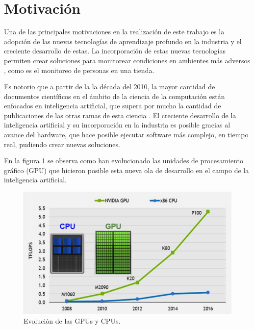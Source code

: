

\section{Motivación}
\label{sec:motivacion}

Una de las principales motivaciones en la realización de este trabajo es la adopción de las nuevas tecnologías de aprendizaje profundo en la industria y el  creciente desarrollo de estas. La incorporación de estas nuevas tecnologías permiten crear soluciones para monitorear condiciones en ambientes más adversos , como es el monitoreo de personas en una tienda.

Es notorio que a partir de la la década del 2010, la mayor cantidad de documentos científicos en el ámbito de la ciencia de la computación están enfocados en inteligencia artificial, que supera por mucho la cantidad de publicaciones de las otras ramas de esta ciencia \citep{AI_PAPERS}. El creciente desarrollo de la inteligencia artificial y su incorporación en la industria es posible gracias al avance del hardware, que hace posible ejecutar software más complejo, en tiempo real, pudiendo crear nuevas soluciones.

\newpage

En la figura \ref{fig:cpuGPU} se observa como han evolucionado las unidades de procesamiento gráfico (GPU) que hicieron posible esta nueva ola de desarrollo en el campo de la inteligencia artificial.

\begin{figure}[ht]
	\centering
	\includegraphics[scale=.8]{./Figures/cpuGPU.jpg}
	\caption{Evolución de las GPUs y CPUs\protect\footnotemark.}
	\label{fig:cpuGPU}
\end{figure}

